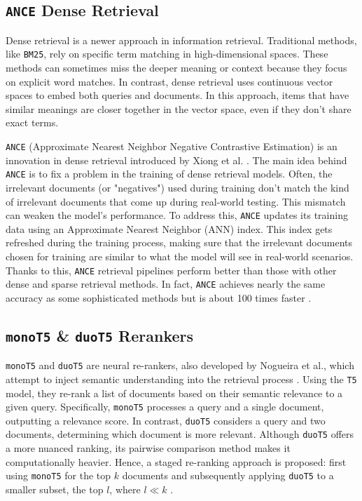 \documentclass[sigconf]{acmart}
\begin{document}
\subsection*{\texttt{ANCE} Dense Retrieval}\label{sec:ance}
Dense retrieval is a newer approach in information retrieval. Traditional methods, like \texttt{BM25}, rely on specific term matching in high-dimensional spaces. These methods can sometimes miss the deeper meaning or context because they focus on explicit word matches. In contrast, dense retrieval uses continuous vector spaces to embed both queries and documents. In this approach, items that have similar meanings are closer together in the vector space, even if they don't share exact terms.

\texttt{ANCE} (Approximate Nearest Neighbor Negative Contrastive Estimation) is an innovation in dense retrieval introduced by Xiong et al. \cite{xiong2020ance}. The main idea behind \texttt{ANCE} is to fix a problem in the training of dense retrieval models. Often, the irrelevant documents (or "negatives") used during training don't match the kind of irrelevant documents that come up during real-world testing. This mismatch can weaken the model's performance. To address this, \texttt{ANCE} updates its training data using an Approximate Nearest Neighbor (ANN) index. This index gets refreshed during the training process, making sure that the irrelevant documents chosen for training are similar to what the model will see in real-world scenarios. Thanks to this, \texttt{ANCE} retrieval pipelines perform better than those with other dense and sparse retrieval methods. In fact, \texttt{ANCE} achieves nearly the same accuracy as some sophisticated methods but is about 100 times faster \cite{xiong2020ance}.

\subsection*{\texttt{monoT5} \& \texttt{duoT5} Rerankers}\label{sec:rerankers}
\texttt{monoT5} and \texttt{duoT5} are neural re-rankers, also developed by Nogueira et al., which attempt to inject semantic understanding into the retrieval process \cite{nogueira2020document,nogueira2019multi}. Using the \texttt{T5} model, they re-rank a list of documents based on their semantic relevance to a given query. Specifically, \texttt{monoT5} processes a query and a single document, outputting a relevance score. In contrast, \texttt{duoT5} considers a query and two documents, determining which document is more relevant. Although \texttt{duoT5} offers a more nuanced ranking, its pairwise comparison method makes it computationally heavier. Hence, a staged re-ranking approach is proposed: first using \texttt{monoT5} for the top $k$ documents and subsequently applying \texttt{duoT5} to a smaller subset, the top $l$, where $l \ll k$ \cite{nogueira2019multi,pradeep2021expando}.
\end{document}
